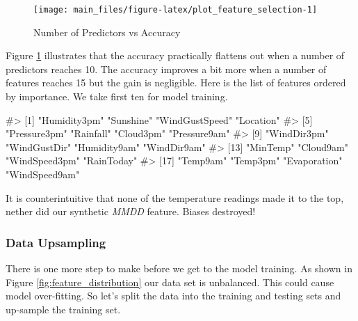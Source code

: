 \begin{Schunk}
\begin{figure}[H]

{\centering \texttt{[image: main\_files/figure-latex/plot\_feature\_selection-1]} 

}

\caption[Number of Predictors vs Accuracy]{Number of Predictors vs Accuracy}\label{fig:plot_feature_selection}
\end{figure}
\end{Schunk}

Figure \ref{fig:plot_feature_selection} illustrates that the accuracy
practically flattens out when a number of predictors reaches 10. The
accuracy improves a bit more when a number of features reaches 15 but
the gain is negligible. Here is the list of features ordered by
importance. We take first ten for model training.

\begin{Schunk}
\begin{Soutput}
#>  [1] "Humidity3pm"   "Sunshine"      "WindGustSpeed" "Location"     
#>  [5] "Pressure3pm"   "Rainfall"      "Cloud3pm"      "Pressure9am"  
#>  [9] "WindDir3pm"    "WindGustDir"   "Humidity9am"   "WindDir9am"   
#> [13] "MinTemp"       "Cloud9am"      "WindSpeed3pm"  "RainToday"    
#> [17] "Temp9am"       "Temp3pm"       "Evaporation"   "WindSpeed9am"
\end{Soutput}
\end{Schunk}

It is counterintuitive that none of the temperature readings made it to
the top, nether did our synthetic \emph{MMDD} feature. Biases destroyed!

\hypertarget{data-upsampling}{%
\subsubsection{Data Upsampling}\label{data-upsampling}}

There is one more step to make before we get to the model training. As
shown in Figure \ref{fig:feature_distribution} our data set is
unbalanced. This could cause model over-fitting. So let's split the data
into the training and testing sets and up-sample the training set.

